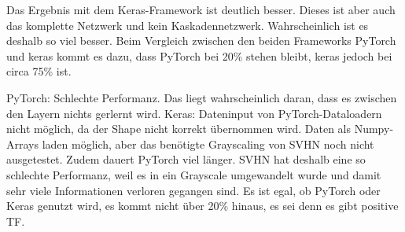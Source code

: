     Das Ergebnis mit dem Keras-Framework ist deutlich besser. Dieses ist aber auch das komplette 
    Netzwerk und kein Kaskadennetzwerk. Wahrscheinlich ist es deshalb so viel besser.
    Beim Vergleich zwischen den beiden Frameworks PyTorch und keras kommt es dazu, dass 
    PyTorch bei 20\% stehen bleibt, keras jedoch bei circa 75\% ist. 

    PyTorch: Schlechte Performanz. Das liegt wahrscheinlich daran, dass es zwischen den 
    Layern nichts gerlernt wird.
    Keras: Dateninput von PyTorch-Dataloadern nicht möglich, da der Shape nicht korrekt 
    übernommen wird. Daten als Numpy-Arrays laden möglich, aber das benötigte Grayscaling 
    von SVHN noch nicht ausgetestet. Zudem dauert PyTorch viel länger.
    SVHN hat deshalb eine so schlechte Performanz, weil es in ein Grayscale umgewandelt wurde 
    und damit sehr viele Informationen verloren gegangen sind. Es ist egal, ob PyTorch oder 
    Keras genutzt wird, es kommt nicht über 20\% hinaus, es sei denn es gibt positive TF. 
